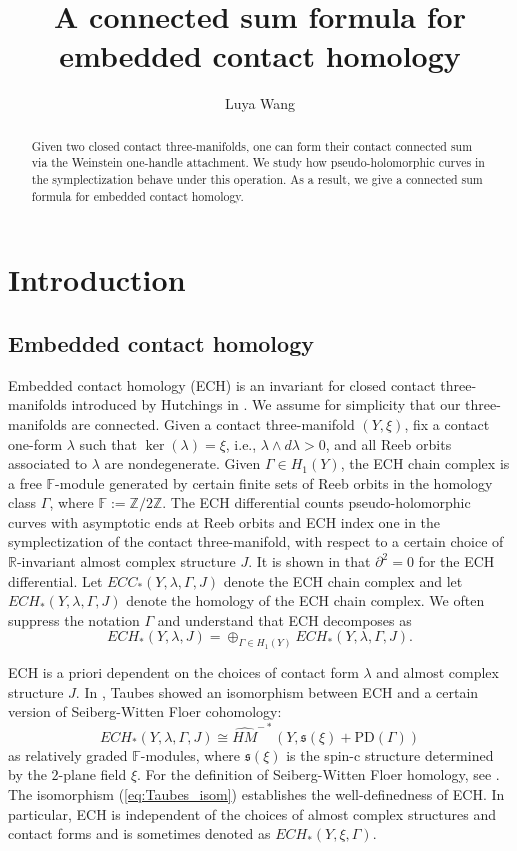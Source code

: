 \documentclass{article}
\title{A connected sum formula for embedded contact homology}
\author{Luya Wang}
\date{}
\numberwithin{equation}{section}
\theoremstyle{definition}
\newcommand{\R}{\mathbb{R}}
\newcommand{\Z}{\mathbb{Z}}
\newcommand{\F}{\mathbb{F}}
\begin{document}
\maketitle
\begin{abstract}
    Given two closed contact three-manifolds, one can form their contact connected sum via the Weinstein one-handle attachment. We study how pseudo-holomorphic curves in the symplectization behave under this operation. As a result, we give a connected sum formula for embedded contact homology.
\end{abstract}



\section{Introduction}
\subsection{Embedded contact homology}
Embedded contact homology (ECH) is an invariant for closed contact three-manifolds introduced by Hutchings in \cite{Hutchings_index_inequality, Hutchings}. We assume for simplicity that our three-manifolds are connected. Given a contact three-manifold $(Y,\xi)$, fix a contact one-form $\lambda$ such that $\ker(\lambda) = \xi$, i.e., $\lambda \wedge d\lambda >0$, and all Reeb orbits associated to $\lambda$ are nondegenerate. Given $\Gamma\in H_1(Y)$, the ECH chain complex is a free $\F$-module generated by certain
finite sets of Reeb orbits in the homology class $\Gamma$, where $\F:=\Z/2\Z$. The ECH differential counts pseudo-holomorphic curves with asymptotic ends at Reeb orbits and ECH index one in the symplectization of the contact three-manifold, with respect to a certain choice of $\R$-invariant almost complex structure $J$. It is shown in \cite{HT_gluing1,HT_gluing2} that $\partial^2 = 0$ for the ECH differential. Let $ECC_*(Y,\lambda, \Gamma, J)$ denote the ECH chain complex and let $ECH_*(Y,\lambda, \Gamma, J)$ denote the homology of the ECH chain complex. We often suppress the notation $\Gamma$ and understand that ECH decomposes as 
$$ECH_*(Y,\lambda, J) = \oplus_{\Gamma\in H_1(Y)}ECH_*(Y,\lambda, \Gamma, J).$$

ECH is a priori dependent on the choices of contact form $\lambda$ and almost complex structure $J$. In \cite{Taubes_isomorphism_I,Taubes_isomorphism_II, Taubes_isomorphism_III, Taubes_isomorphism_IV, Taubes_isomorphism_V}, Taubes showed an isomorphism between ECH and a certain version of Seiberg-Witten Floer cohomology:
\begin{equation}
\label{eq:Taubes_isom}
    ECH_*(Y,\lambda, \Gamma, J) \cong \widehat{HM}^{-*}(Y, \mathfrak{s}(\xi) + \text{PD}(\Gamma))
\end{equation}
as relatively graded $\F$-modules, where $\mathfrak{s}(\xi)$ is the spin-c structure determined by the $2$-plane field $\xi$. For the definition of Seiberg-Witten Floer homology, see \cite{Kronheimer_Mrowka}. The isomorphism (\ref{eq:Taubes_isom}) establishes the well-definedness of ECH. In particular, ECH is independent of the choices of almost complex structures and contact forms and is sometimes denoted as $ECH_*(Y,\xi, \Gamma)$.
\end{document}
